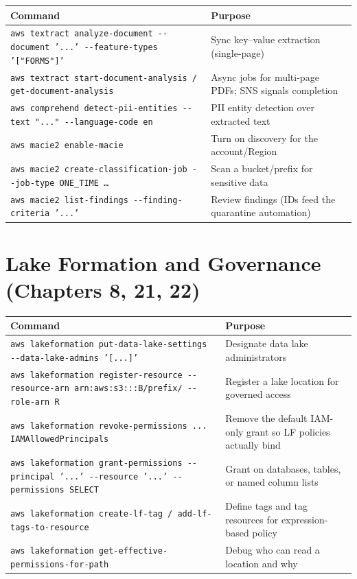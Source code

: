 \begin{center}
\footnotesize
\begin{tabular}{@{}p{7.2cm}p{7.6cm}@{}}
\toprule
\textbf{Command} & \textbf{Purpose} \\
\midrule
\texttt{aws textract analyze-document -{}-document '{...}' -{}-feature-types '["FORMS"]'} & Sync key--value extraction (single-page) \\
\texttt{aws textract start-document-analysis / get-document-analysis} & Async jobs for multi-page PDFs; SNS signals completion \\
\texttt{aws comprehend detect-pii-entities -{}-text "..." -{}-language-code en} & PII entity detection over extracted text \\
\texttt{aws macie2 enable-macie} & Turn on discovery for the account/Region \\
\texttt{aws macie2 create-classification-job -{}-job-type ONE\_TIME \dots} & Scan a bucket/prefix for sensitive data \\
\texttt{aws macie2 list-findings -{}-finding-criteria '{...}'} & Review findings (IDs feed the quarantine automation) \\
\bottomrule
\end{tabular}
\end{center}

\section{Lake Formation and Governance (Chapters 8, 21, 22)}
%

\begin{center}
\footnotesize
\begin{tabular}{@{}p{7.2cm}p{7.6cm}@{}}
\toprule
\textbf{Command} & \textbf{Purpose} \\
\midrule
\texttt{aws lakeformation put-data-lake-settings -{}-data-lake-admins '[...]'} & Designate data lake administrators \\
\texttt{aws lakeformation register-resource -{}-resource-arn arn:aws:s3:::B/prefix/ -{}-role-arn R} & Register a lake location for governed access \\
\texttt{aws lakeformation revoke-permissions ... IAMAllowedPrincipals} & Remove the default IAM-only grant so LF policies actually bind \\
\texttt{aws lakeformation grant-permissions -{}-principal '{...}' -{}-resource '{...}' -{}-permissions SELECT} & Grant on databases, tables, or named column lists \\
\texttt{aws lakeformation create-lf-tag / add-lf-tags-to-resource} & Define tags and tag resources for expression-based policy \\
\texttt{aws lakeformation get-effective-permissions-for-path} & Debug who can read a location and why \\
\bottomrule
\end{tabular}
\end{center}

